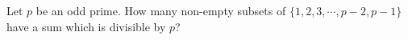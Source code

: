 Let $p$ be an odd prime. How many non-empty subsets of $\{1, 2, 3, \cdots, p-2, p-1\}$ have a sum which is divisible by $p$?